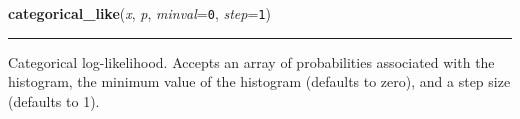     \label{pymc:distributions:categorical_like}

    \vspace{0.5ex}

\hspace{.8\funcindent}\begin{boxedminipage}{\funcwidth}

    \raggedright \textbf{categorical\_like}(\textit{x}, \textit{p}, \textit{minval}={\tt 0}, \textit{step}={\tt 1})

    \vspace{-1.5ex}

    \rule{\textwidth}{1pt}
\setlength{\parskip}{2ex}

Categorical log-likelihood.
Accepts an array of probabilities associated with the histogram,
the minimum value of the histogram (defaults to zero),
and a step size (defaults to 1).
\setlength{\parskip}{1ex}
    \end{boxedminipage}

    \label{pymc:distributions:cauchy_like}

    \vspace{0.5ex}

